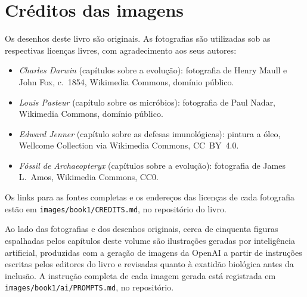 \chapter*{Créditos das imagens}

Os desenhos deste livro são originais. As fotografias são utilizadas
sob as respectivas licenças livres, com agradecimento aos seus autores:

\begin{itemize}
  \item \emph{Charles Darwin} (capítulos sobre a evolução):
        fotografia de Henry Maull e John Fox, c.~1854, Wikimedia
        Commons, domínio público.
  \item \emph{Louis Pasteur} (capítulo sobre os micróbios):
        fotografia de Paul Nadar, Wikimedia Commons, domínio público.
  \item \emph{Edward Jenner} (capítulo sobre as defesas imunológicas):
        pintura a óleo, Wellcome Collection via Wikimedia Commons,
        CC~BY~4.0.
  \item \emph{Fóssil de Archaeopteryx} (capítulos sobre a evolução):
        fotografia de James L.~Amos, Wikimedia Commons, CC0.
\end{itemize}

Os links para as fontes completas e os endereços das licenças de cada
fotografia estão em \texttt{images/book1/CREDITS.md}, no repositório do
livro.

\bigskip
Ao lado das fotografias e dos desenhos originais, cerca de cinquenta
figuras espalhadas pelos capítulos deste volume são ilustrações geradas
por inteligência artificial, produzidas com a geração de imagens da
OpenAI a partir de instruções escritas pelos editores do livro e
revisadas quanto à exatidão biológica antes da inclusão. A instrução
completa de cada imagem gerada está registrada em
\texttt{images/book1/ai/PROMPTS.md}, no repositório.
\clearpage
